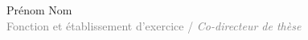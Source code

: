 {\begin{multicols}{2}
Prénom Nom \\ \textcolor{gray}{Fonction et établissement d'exercice  / \textit{Co-directeur de thèse}}\\

\end{multicols}
}


\maketitle
